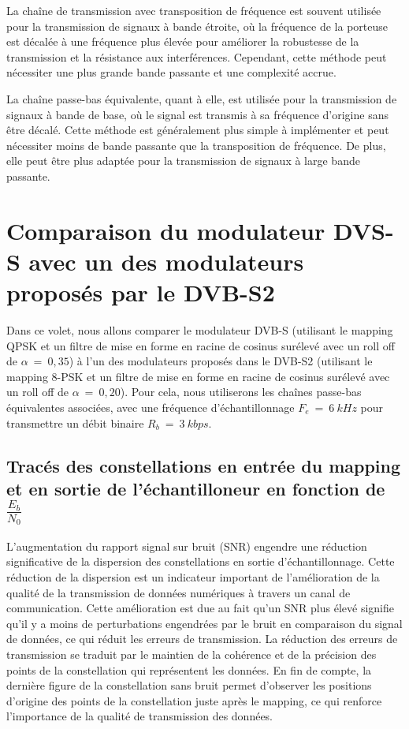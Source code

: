 \documentclass[11pt]{article}
\begin{document}
La chaîne de transmission avec transposition de fréquence est souvent utilisée pour la transmission de signaux à bande étroite, où la fréquence de la porteuse est décalée à une fréquence plus élevée pour améliorer la robustesse de la transmission et la résistance aux interférences. Cependant, cette méthode peut nécessiter une plus grande bande passante et une complexité accrue.

La chaîne passe-bas équivalente, quant à elle, est utilisée pour la transmission de signaux à bande de base, où le signal est transmis à sa fréquence d'origine sans être décalé. Cette méthode est généralement plus simple à implémenter et peut nécessiter moins de bande passante que la transposition de fréquence. De plus, elle peut être plus adaptée pour la transmission de signaux à large bande passante.

\section{Comparaison du modulateur DVS-S avec un des modulateurs proposés par le DVB-S2}
Dans ce volet, nous allons comparer le modulateur DVB-S (utilisant le mapping QPSK et un filtre de mise en forme en racine de cosinus surélevé avec un roll off de $\alpha \ = \ 0,35$) à l'un des modulateurs proposés dans le DVB-S2 (utilisant le mapping 8-PSK et un filtre de mise en forme en racine de cosinus surélevé avec un roll off de $ \alpha \ = \ 0,20$). Pour cela, nous utiliserons les chaînes passe-bas équivalentes associées, avec une fréquence d'échantillonnage $F_e \ = \ 6 \ kHz$ pour transmettre un débit binaire $R_b \ = \ 3 \ kbps$.

\subsection{Tracés des constellations en entrée du mapping et en sortie de l'échantilloneur en fonction de $\frac{E_b}{N_0}$}

L'augmentation du rapport signal sur bruit (SNR) engendre une réduction significative de la dispersion des constellations en sortie d'échantillonnage. Cette réduction de la dispersion est un indicateur important de l'amélioration de la qualité de la transmission de données numériques à travers un canal de communication. Cette amélioration est due au fait qu'un SNR plus élevé signifie qu'il y a moins de perturbations engendrées par le bruit en comparaison du signal de données, ce qui réduit les erreurs de transmission. La réduction des erreurs de transmission se traduit par le maintien de la cohérence et de la précision des points de la constellation qui représentent les données. En fin de compte, la dernière figure de la constellation sans bruit permet d'observer les positions d'origine des points de la constellation juste après le mapping, ce qui renforce l'importance de la qualité de transmission des données.
\end{document}
